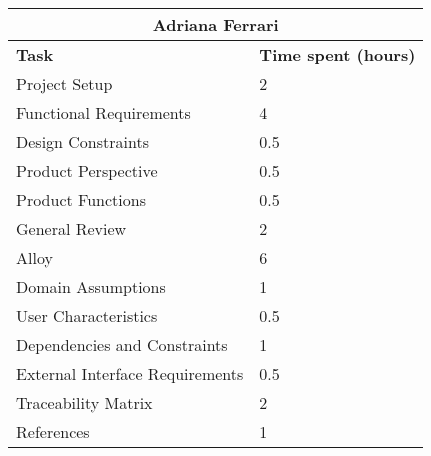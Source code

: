 \begin{table}[h]
  \center
  \begin{tabular}{l|l}
    \multicolumn{2}{c}{\textbf{Adriana Ferrari}} \\
    \hline
    \textbf{Task} & \textbf{Time spent (hours)}\\
    \hline
    Project Setup & 2 \\
    Functional Requirements & 4 \\
    Design Constraints & 0.5 \\
    Product Perspective & 0.5 \\
    Product Functions & 0.5 \\
    General Review & 2 \\
    Alloy & 6 \\
    Domain Assumptions & 1 \\
    User Characteristics & 0.5 \\
    Dependencies and Constraints & 1 \\
    External Interface Requirements & 0.5 \\
    Traceability Matrix & 2 \\
    References & 1 \\
  \end{tabular}
\end{table}